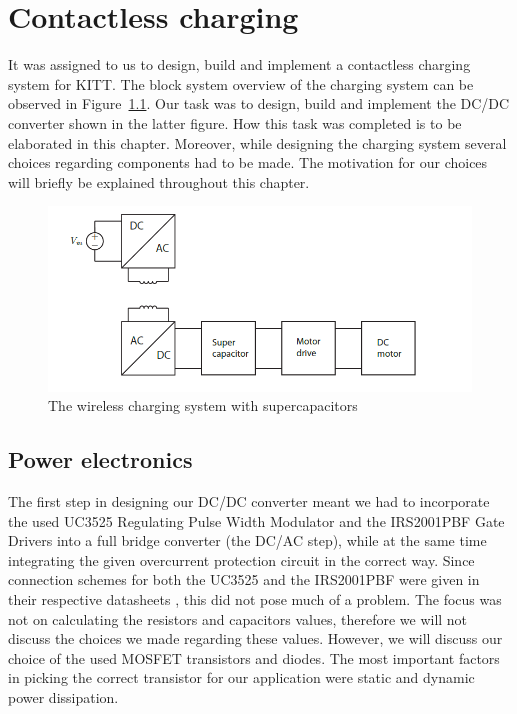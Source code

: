 \documentclass[11pt,titlepage]{report}
\begin{document}
\chapter{Contactless charging}
\label{ch:charging}
It was assigned to us to design, build and implement a contactless charging system for KITT. The block system overview of the charging system can be observed in Figure~\ref{fig:contactless_charging}. Our task was to design, build and implement the DC/DC converter shown in the latter figure. How this task was completed is to be elaborated in this chapter. Moreover, while designing the charging system several choices regarding components had to be made. The motivation for our choices will briefly be explained throughout this chapter. \\	

\begin{figure}[H]
	\begin{center}
		\includegraphics[width=0.8\linewidth]{resource/contactless_charging.png}
	\end{center}
	\caption{The wireless charging system with supercapacitors}
	\label{fig:contactless_charging}
\end{figure}

\section{Power electronics}
The first step in designing our DC/DC converter meant we had to incorporate the used UC3525 Regulating
Pulse Width Modulator and the IRS2001PBF Gate Drivers into a full bridge converter (the
DC/AC step), while at the same time integrating the given overcurrent protection circuit in the correct
way. Since connection schemes for both the UC3525 and the IRS2001PBF were given in their respective
datasheets \cite{uc3525a-datasheet}, \cite{irs2001pbf-datasheet} this did not pose much of a problem. The focus
was not on calculating the resistors and capacitors values, therefore we will not discuss the choices we
made regarding these values. However, we will discuss our choice of the used MOSFET transistors and
diodes. The most important factors in picking the correct transistor for our application were static and
dynamic power dissipation. \\
\end{document}

